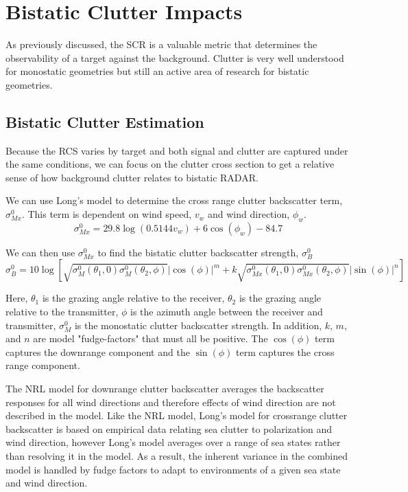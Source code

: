 \section{Bistatic Clutter Impacts}

As previously discussed, the SCR is a valuable metric that determines the observability of a target against the background. Clutter is very well understood for monostatic geometries but still an active area of research for bistatic geometries.

\subsection {Bistatic Clutter Estimation}
Because the RCS varies by target and both signal and clutter are captured under the same conditions, we can focus on the clutter cross section to get a relative sense of how background clutter relates to bistatic RADAR.

We can use Long's model \cite{griffiths_bistatic_clutter} to determine the cross range clutter backscatter term, $\sigma_{Mx}^0$. This term is dependent on wind speed, $v_w$ and wind direction, $\phi_w$.
\begin{equation}
\sigma_{Mx}^0 = 29.8\log\left(0.5144 v_w\right) + 6\cos\left(\phi_w \right) -84.7
\label{bc_eq:1}
\end{equation}
\renewcommand{\baselinestretch}{2} \small\normalsize

We can then use $\sigma_{Mx}^0$ to find the bistatic clutter backscatter strength, $\sigma_{B}^0$
\begin{equation}
\sigma_B^0 = 10\log\left[\sqrt{\sigma_M^0(\theta_1,0)\sigma_M^0(\theta_2,\phi)} |\cos(\phi)|^m  + k\sqrt{\sigma_{Mx}^0(\theta_1,0)\sigma_{Mx}^0(\theta_2,\phi)}|\sin(\phi)|^n \right]
\label{bc_eq:2}
\end{equation}
\renewcommand{\baselinestretch}{2} \small\normalsize

Here, $\theta_1$ is the grazing angle relative to the receiver, $\theta_2$ is the grazing angle relative to the transmitter, $\phi$ is the azimuth angle between the receiver and transmitter, $\sigma_M^0$ is the monostatic clutter backscatter strength. In addition, $k$, $m$, and $n$ are model "fudge-factors" that must all be positive. The $\cos(\phi)$ term captures the downrange component and the $\sin(\phi)$ term captures the cross range component.

The NRL model for downrange clutter backscatter averages the backscatter responses for all wind directions and therefore effects of wind direction are not described in the model. Like the NRL model, Long's model for crossrange clutter backscatter is based on empirical data relating sea clutter to polarization and wind direction, however Long's model averages over a range of sea states rather than resolving it in the model. As a result, the inherent variance in the combined model is handled by fudge factors to adapt to environments of a given sea state and wind direction.

